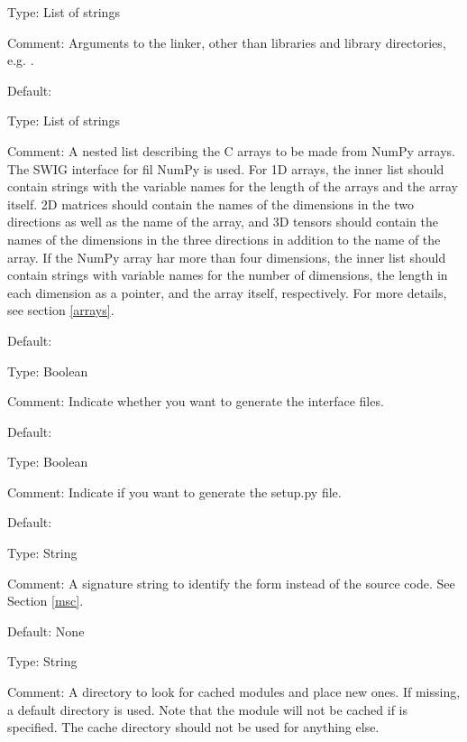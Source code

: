     \item Type: List of strings
    \item Comment: Arguments to the linker, other than libraries and library
      directories, e.g. \emp{['-E', '-U']}.
  \eit
\item {}
  \bit
    \item Default: \emp{[]}
    \item Type: List of strings
    \item Comment: A nested list describing the C arrays to be made from NumPy arrays.
        The SWIG interface for fil NumPy is used. For 1D arrays, the inner
        list should contain strings with the variable names for the length of
        the arrays and the array itself. 2D matrices should contain the names
        of the dimensions in the two directions as well as the name of the
        array, and 3D tensors should contain the names of the dimensions in
        the three directions in addition to the name of the array.
        If the NumPy array har more than four dimensions, the inner list should
        contain strings with variable names for the number of dimensions,
        the length in each dimension as a pointer, and the array itself,
        respectively. For more details, see section \ref{arrays}.
  \eit
\item {}
  \bit
    \item Default: 
    \item Type: Boolean
    \item Comment: Indicate whether you want to generate the interface files.
  \eit
\item {}
  \bit
    \item Default: 
    \item Type: Boolean
    \item Comment: Indicate if you want to generate the setup.py file.
  \eit
\item {}
  \bit
    \item Default: 
    \item Type: String
    \item Comment: A signature string to identify the form instead of the
      source code. See Section \ref{msc}.
  \eit
\item {}
  \bit
    \item Default: None
    \item Type: String
    \item Comment: A directory to look for cached modules and place new ones.
      If missing, a default directory is used. Note that the module
      will not be cached if  is specified.
      The cache directory should not be used for anything else.
  \eit
\eit



